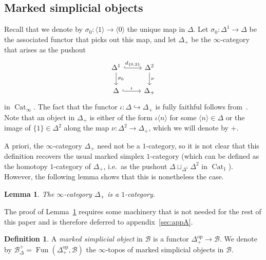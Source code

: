\documentclass[reqno]{amsart}
\numberwithin{equation}{subsection}
\theoremstyle{plain}
\newtheorem{lemma}[equation]{Lemma}
\theoremstyle{definition}
\newtheorem{definition}[equation]{Definition}
\let\scr=\mathcal
\let\into=\hookrightarrow
\def\BB{\scr B}
\DeclareMathOperator{\Cat}{Cat}
\DeclareMathOperator{\Fun}{Fun}
\newcommand{\op}{\mathrm{op}}
\newcommand{\ord}[1]{\langle#1\rangle}
\newcommand{\mSimp}[1]{#1_{\Delta}^+}
\newcommand{\CatS}{\Cat_{\infty}}
\begin{document}
\subsection{Marked simplicial objects}
\label{sec:markedSimplicialObjects}
Recall that we denote by $\sigma_0\colon\ord{1}\to\ord{0}$ the unique map in $\Delta$. Let $\sigma_0\colon \Delta^1\to \Delta$ be the associated functor that picks out this map, and let $\Delta_+$ be the $\infty$-category that arises as the pushout
\begin{equation*}
\begin{tikzcd}
\Delta^1\arrow[d, "\sigma_0"]\arrow[r, hookrightarrow, "d_{\{0,2\}}"] & \Delta^2\arrow[d, "\nu"]\\
\Delta\arrow[r, hookrightarrow, "\iota"] & \Delta_+
\end{tikzcd}
\end{equation*}
in $\CatS$. The fact that the functor $\iota\colon\Delta\into \Delta_+$ is fully faithful follows from~\cite[Lemma~6.3.9]{Martini2021a}. Note that an object in $\Delta_+$ is either of the form $\iota\ord{n}$ for some $\ord{n}\in \Delta$ or the image of $\{1\}\in\Delta^2$ along the map $\nu\colon\Delta^2\to \Delta_+$, which we will denote by $+$. 

A priori, the $\infty$-category $\Delta_+$ need not be a $1$-category, so it is not clear that this definition recovers the usual marked simplex $1$-category (which can be defined as the homotopy $1$-category of $\Delta_+$, i.e.\ as the pushout $\Delta\sqcup_{\Delta^1}\Delta^2$ in $\Cat_1$). However, the following lemma shows that this is nonetheless the case.
\begin{lemma}
	\label{lem:markedSimplexOrdinaryCategory}
	The $\infty$-category $\Delta_+$ is a $1$-category.
\end{lemma}
The proof of Lemma~\ref{lem:markedSimplexOrdinaryCategory} requires some machinery that is not needed for the rest of this paper and is therefore deferred to appendix~\ref{sec:appA}.

\begin{definition}
\label{def:markedSimplicialObjects}
A \emph{marked simplicial object} in $\BB$ is a functor $\Delta_+^{\op}\to\BB$. We denote by $\mSimp\BB = \Fun(\Delta_+^{\op},\BB)$ the $\infty$-topos of marked simplicial objects in $\BB$.
\end{definition}
\end{document}
